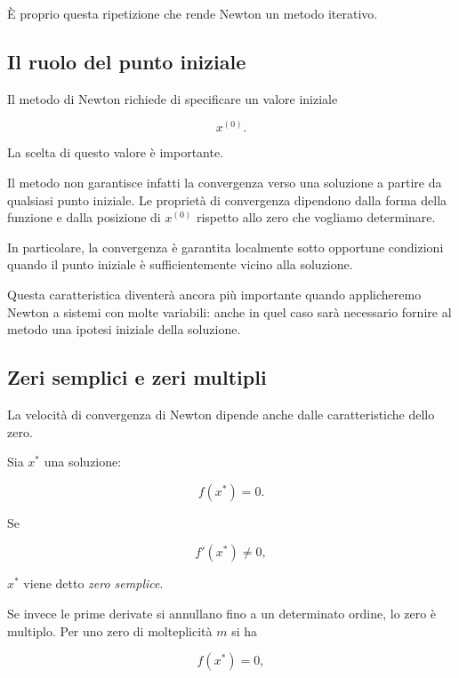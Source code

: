 È proprio questa ripetizione che rende Newton un metodo iterativo.


\subsection{Il ruolo del punto iniziale}

Il metodo di Newton richiede di specificare un valore iniziale

\begin{equation*}
    x^{(0)}.
\end{equation*}

La scelta di questo valore è importante.

Il metodo non garantisce infatti la convergenza verso una soluzione
a partire da qualsiasi punto iniziale. Le proprietà di convergenza
dipendono dalla forma della funzione e dalla posizione di
$x^{(0)}$ rispetto allo zero che vogliamo determinare.

In particolare, la convergenza è garantita localmente sotto
opportune condizioni quando il punto iniziale è sufficientemente
vicino alla soluzione.

Questa caratteristica diventerà ancora più importante quando
applicheremo Newton a sistemi con molte variabili: anche in quel
caso sarà necessario fornire al metodo una ipotesi iniziale della
soluzione.


\subsection{Zeri semplici e zeri multipli}

La velocità di convergenza di Newton dipende anche dalle
caratteristiche dello zero.

Sia $x^*$ una soluzione:

\begin{equation*}
    f(x^*)=0.
\end{equation*}

Se

\begin{equation*}
    f'(x^*)\neq0,
\end{equation*}

$x^*$ viene detto \emph{zero semplice}.

Se invece le prime derivate si annullano fino a un determinato
ordine, lo zero è multiplo. Per uno zero di molteplicità $m$ si ha

\begin{equation*}
    f(x^*)=0,
\end{equation*}

